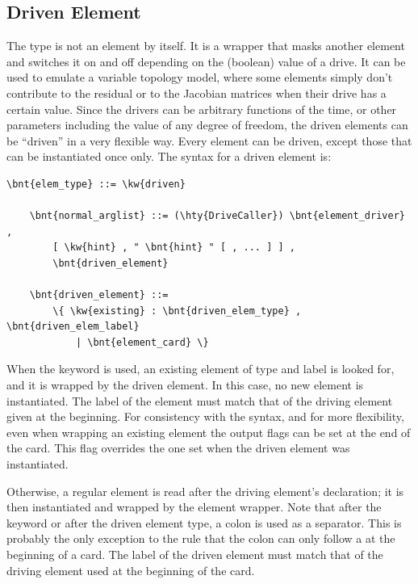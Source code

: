 \subsection{Driven Element}\label{sec:EL:BASE:DRIVEN}
The  type is not an element by itself. It is a wrapper that
masks another element and switches it on and off depending on the (boolean)
value of a drive. It can be used to emulate a variable topology model,
where some elements simply don't contribute to the residual
or to the Jacobian matrices when their drive has a certain value.
Since the drivers can be arbitrary functions of the time, 
or other parameters including the value of any degree of freedom, 
the driven elements can be ``driven'' in a very flexible way.
Every element can be driven, except those that can be instantiated once only.
The syntax for a driven element is:
\begin{Verbatim}[commandchars=\\\{\}]
    \bnt{elem_type} ::= \kw{driven}

    \bnt{normal_arglist} ::= (\hty{DriveCaller}) \bnt{element_driver} ,
        [ \kw{hint} , " \bnt{hint} " [ , ... ] ] ,
        \bnt{driven_element}

    \bnt{driven_element} ::=
        \{ \kw{existing} : \bnt{driven_elem_type} , \bnt{driven_elem_label}
            | \bnt{element_card} \}
\end{Verbatim}
When the keyword  is used, an existing element 
of type  and label  is looked for, 
and it is wrapped by the driven element.
In this case, no new element is instantiated.
The label of the element must match that of the driving element given 
at the beginning.
For consistency with the syntax, and for more flexibility, 
even when wrapping an existing element the output flags can be set
at the end of the card.
This flag overrides the one set when the driven element was instantiated.

Otherwise, a regular element is read after the driving element's declaration;
it is then instantiated and wrapped by the  element wrapper.
Note that after the keyword  or after the driven element type,
a colon is used as a separator.
This is probably the only exception to the rule that the colon
can only follow a  at the beginning of a card.
The label  of the driven element must match that
of the driving element used at the beginning of the  card.

